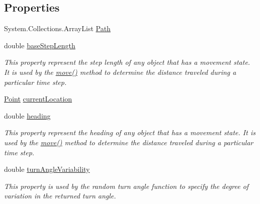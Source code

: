 \subsection*{Properties}
\begin{DoxyCompactItemize}
\item 
System.\-Collections.\-Array\-List \hyperlink{class_p_a_z___dispersal_1_1_mover_a49a2613ef9db2a286ce9ca93b2bbda5c}{Path}
\item 
double \hyperlink{class_p_a_z___dispersal_1_1_mover_a198a0a67d6a01188ac3fac0720a14705}{base\-Step\-Length}
\begin{DoxyCompactList}\small\item\em This property represent the step length of any object that has a movement state. It is used by the \hyperlink{class_p_a_z___dispersal_1_1_mover_a04569135e604bce393016fe205025389}{move()} method to determine the distance traveled during a particular time step. \end{DoxyCompactList}\item 
\hyperlink{class_p_a_z___dispersal_1_1_point}{Point} \hyperlink{class_p_a_z___dispersal_1_1_mover_a40bf8a68b88ec18b2c8eec3deab81d36}{current\-Location}
\item 
double \hyperlink{class_p_a_z___dispersal_1_1_mover_ac20334b4c2d135dbd5dce2642618316f}{heading}
\begin{DoxyCompactList}\small\item\em This property represent the heading of any object that has a movement state. It is used by the \hyperlink{class_p_a_z___dispersal_1_1_mover_a04569135e604bce393016fe205025389}{move()} method to determine the distance traveled during a particular time step. \end{DoxyCompactList}\item 
double \hyperlink{class_p_a_z___dispersal_1_1_mover_a61c526e57350e198994da161c9135493}{turn\-Angle\-Variability}
\begin{DoxyCompactList}\small\item\em This property is used by the random turn angle function to specify the degree of variation in the returned turn angle. \end{DoxyCompactList}\item 

\end{DoxyCompactItemize}
